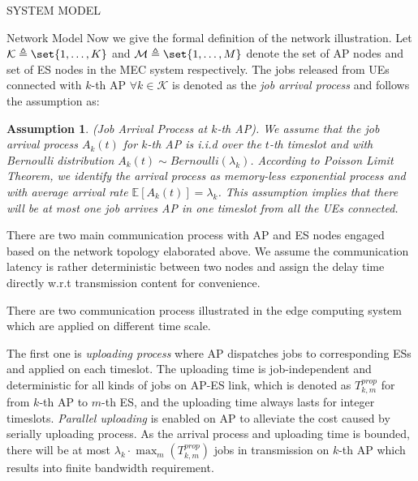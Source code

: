 \documentclass[10pt, conference, letterpaper]{IEEEtran}
\newtheorem{assumption}{Assumption}
\DeclarePairedDelimiter\set\{\}
\newcommand{\apSet}{\mathcal{K}}
\begin{document}
\begin{section}{SYSTEM MODEL}
\begin{subsection}{Network Model}
            Now we give the formal definition of the network illustration. Let $\mathcal{K} \triangleq \set{1,\dots,K}$ and $\mathcal{M} \triangleq \set{1,\dots,M}$ denote the set of AP nodes and set of ES nodes in the MEC system respectively. The jobs released from UEs connected with $k$-th AP $\forall k\in\apSet$ is denoted as the \emph{job arrival process} and follows the assumption as:
            \begin{assumption}
                (Job Arrival Process at $k$-th AP).
                We assume that the job arrival process $A_k(t)$ for $k$-th AP is i.i.d over the $t$-th timeslot and with Bernoulli distribution $A_k(t) \sim Bernoulli(\lambda_k)$.  According to Poisson Limit Theorem, we identify the arrival process as memory-less exponential process and with average arrival rate $\mathbb{E}[A_k(t)] = \lambda_k$.
                This assumption implies that there will be at most one job arrives AP in one timeslot from all the UEs connected.
            \end{assumption}

            There are two main communication process with AP and ES nodes engaged based on the network topology elaborated above. We assume the communication latency is rather deterministic between two nodes and assign the delay time directly w.r.t transmission content for convenience.

            There are two communication process illustrated in the edge computing system which are applied on different time scale.
            
            The first one is \emph{uploading process} where AP dispatches jobs to corresponding ESs and applied on each timeslot. The uploading time is {\color{red}job-independent} and deterministic for all kinds of jobs on AP-ES link, which is denoted as $T^{prop}_{k,m}$ for from $k$-th AP to $m$-th ES, and the uploading time always lasts for integer timeslots. \emph{Parallel uploading} is enabled on AP to alleviate the cost caused by serially uploading process. As the arrival process and uploading time is bounded, there will be at most $\lambda_k \cdot \max_m(T^{prop}_{k,m})$ jobs in transmission on $k$-th AP which results into finite bandwidth requirement.
            

\end{subsection}
\end{section}
\end{document}
